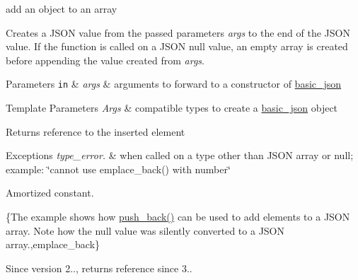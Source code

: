 add an object to an array 

Creates a J\+S\+ON value from the passed parameters {\itshape args} to the end of the J\+S\+ON value. If the function is called on a J\+S\+ON null value, an empty array is created before appending the value created from {\itshape args}.


\begin{DoxyParams}[1]{Parameters}
\mbox{\tt in}  & {\em args} & arguments to forward to a constructor of \hyperlink{classnlohmann_1_1basic__json}{basic\+\_\+json} \\
\hline
\end{DoxyParams}

\begin{DoxyTemplParams}{Template Parameters}
{\em Args} & compatible types to create a \hyperlink{classnlohmann_1_1basic__json}{basic\+\_\+json} object\\
\hline
\end{DoxyTemplParams}
\begin{DoxyReturn}{Returns}
reference to the inserted element
\end{DoxyReturn}

\begin{DoxyExceptions}{Exceptions}
{\em type\+\_\+error.} & when called on a type other than J\+S\+ON array or null; example\+: {\ttfamily \char`\"{}cannot use emplace\+\_\+back() with number\char`\"{}}\\
\hline
\end{DoxyExceptions}
Amortized constant.

\{The example shows how {\ttfamily \hyperlink{classnlohmann_1_1basic__json_ac8e523ddc8c2dd7e5d2daf0d49a9c0d7}{push\+\_\+back()}} can be used to add elements to a J\+S\+ON array. Note how the {\ttfamily null} value was silently converted to a J\+S\+ON array.,emplace\+\_\+back\}

\begin{DoxySince}{Since}
version 2.., returns reference since 3.. 
\end{DoxySince}

